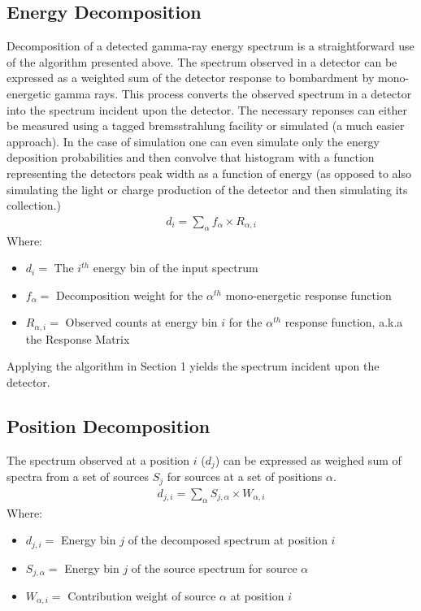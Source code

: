 \documentclass{article}
\begin{document}
\subsection{Energy Decomposition}
Decomposition of a detected gamma-ray energy spectrum is a straightforward use of the algorithm presented above. The spectrum observed in a detector can be expressed as a weighted sum of the detector response to bombardment by mono-energetic gamma rays. This process converts the observed spectrum in a detector into the spectrum incident upon the detector. The necessary reponses can either be measured using a tagged bremsstrahlung facility or simulated (a much easier approach). In the case of simulation one can even simulate only the energy deposition probabilities and then convolve that histogram with a function representing the detectors peak width as a function of energy (as opposed to also simulating the light or charge production of the detector and then simulating its collection.)
\begin{align}
	d_{i} = \sum\limits_{\alpha}f_{\alpha}\times{}R_{\alpha,i}
\end{align}
Where:
\begin{itemize}
\item $d_{i}=$ The $i^{th}$ energy bin of the input spectrum
\item $f_{\alpha}=$ Decomposition weight for the $\alpha^{th}$ mono-energetic response function
\item $R_{\alpha,i}=$ Observed counts at energy bin $i$ for the $\alpha^{th}$ response function, a.k.a the Response Matrix
\end{itemize}

Applying the algorithm in Section 1 yields the spectrum incident upon the detector.


\subsection{Position Decomposition}
The spectrum observed at a position $i$ ($d_j$) can be expressed as weighed sum of spectra from a set of sources $S_{j}$ for sources at a set of positions $\alpha$.
\begin{align}
	d_{j,i} = \sum\limits_{\alpha}S_{j,\alpha}\times{}W_{\alpha,i}
\end{align}
Where:
\begin{itemize}
\item $d_{j,i}=$ Energy bin $j$ of the decomposed spectrum at position $i$
\item $S_{j,\alpha}=$ Energy bin $j$ of the source spectrum for source $\alpha$
\item $W_{\alpha,i}=$ Contribution weight of source $\alpha$ at position $i$
\end{itemize}
\end{document}
